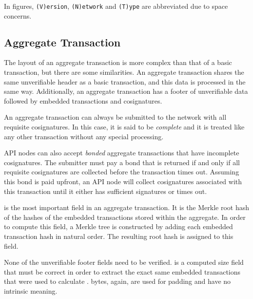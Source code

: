 In figures, \texttt{(V)ersion}, \texttt{(N)etwork} and \texttt{(T)ype} are abbreviated due to space concerns.

\subsection{Aggregate Transaction}
\label{sec:transactions:aggregate}

The layout of an aggregate transaction is more complex than that of a basic transaction, but there are some similarities.
An aggregate transaction shares the same unverifiable header as a basic transaction, and this data is processed in the same way.
Additionally, an aggregate transaction has a footer of unverifiable data followed by embedded transactions and cosignatures.

An aggregate transaction can always be submitted to the network with all requisite cosignatures.
In this case, it is said to be \emph{complete} and it is treated like any other transaction without any special processing.

API nodes can also accept \emph{bonded} aggregate transactions that have incomplete cosignatures.
The submitter must pay a bond that is returned if and only if all requisite cosignatures are collected before the transaction times out.
Assuming this bond is paid upfront, an API node will collect cosignatures associated with this transaction until it either has sufficient signatures or times out.

 is the most important field in an aggregate transaction.
It is the Merkle root hash of the hashes of the embedded transactions stored within the aggregate.
In order to compute this field, a Merkle tree is constructed by adding each embedded transaction hash in natural order.
The resulting root hash is assigned to this field.

None of the unverifiable footer fields need to be verified.
 is a computed size field that must be correct in order to extract the exact same embedded transactions that were used to calculate .
 bytes, again, are used for padding and have no intrinsic meaning.

